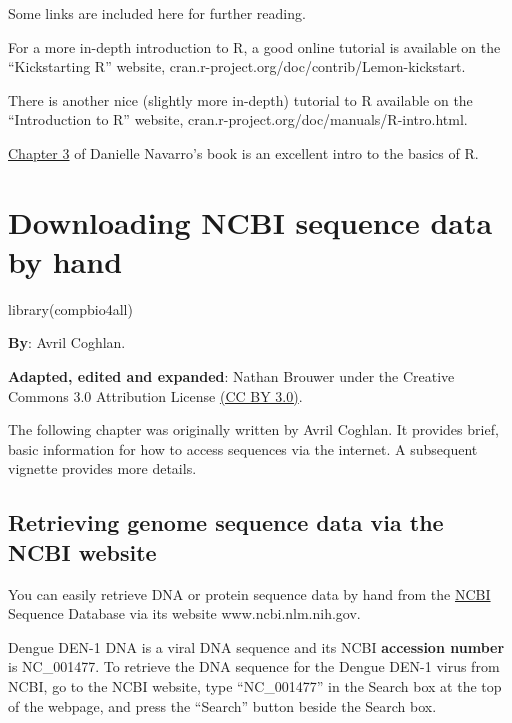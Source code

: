 \documentclass[
]{book}
\newenvironment{Shaded}{\begin{snugshade}}{\end{snugshade}}
\newcommand{\FunctionTok}[1]{\textcolor[rgb]{0.00,0.00,0.00}{#1}}
\newcommand{\NormalTok}[1]{#1}
\begin{document}
Some links are included here for further reading.

For a more in-depth introduction to R, a good online tutorial is available on the ``Kickstarting R'' website, cran.r-project.org/doc/contrib/Lemon-kickstart.

There is another nice (slightly more in-depth) tutorial to R available on the ``Introduction to R'' website, cran.r-project.org/doc/manuals/R-intro.html.

\href{https://learningstatisticswithr.com/book/introR.html}{Chapter 3} of Danielle Navarro's book is an excellent intro to the basics of R.

\hypertarget{downloading-ncbi-sequence-data-by-hand}{%
\chapter{Downloading NCBI sequence data by hand}\label{downloading-ncbi-sequence-data-by-hand}}

\begin{Shaded}
\begin{Highlighting}[]
\FunctionTok{library}\NormalTok{(compbio4all)}
\end{Highlighting}
\end{Shaded}

\textbf{By}: Avril Coghlan.

\textbf{Adapted, edited and expanded}: Nathan Brouwer under the Creative Commons 3.0 Attribution License \href{https://creativecommons.org/licenses/by/3.0/}{(CC BY 3.0)}.

The following chapter was originally written by Avril Coghlan. It provides brief, basic information for how to access sequences via the internet. A subsequent vignette provides more details.

\hypertarget{retrieving-genome-sequence-data-via-the-ncbi-website}{%
\section{Retrieving genome sequence data via the NCBI website}\label{retrieving-genome-sequence-data-via-the-ncbi-website}}

You can easily retrieve DNA or protein sequence data by hand from the \href{www.ncbi.nlm.nih.gov}{NCBI} Sequence Database via its website www.ncbi.nlm.nih.gov.

Dengue DEN-1 DNA is a viral DNA sequence and its NCBI \textbf{accession number} is NC\_001477. To retrieve the DNA sequence for the Dengue DEN-1 virus from NCBI, go to the NCBI website, type ``NC\_001477'' in the Search box at the top of the webpage, and press the ``Search'' button beside the Search box.
\end{document}
